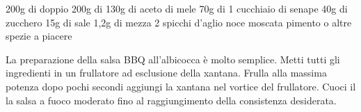 \label{salsa-bbq}
\serves{-}
\begin{ingreds}
	200g di doppio 
	200g di 
	130g di aceto di mele
	70g di 
	1 cucchiaio di senape
	40g di zucchero
	15g di sale
	1,2g di 
	mezza 
	2 spicchi d'aglio
	noce moscata
	pimento o altre spezie a piacere

\end{ingreds}

\begin{method}
La preparazione della salsa BBQ all'albicocca è molto semplice. Metti tutti gli ingredienti in un frullatore ad esclusione della xantana. Frulla alla massima potenza dopo pochi secondi aggiungi la xantana nel vortice del frullatore.
Cuoci il la salsa a fuoco moderato fino al raggiungimento della consistenza desiderata.
\end{method}



